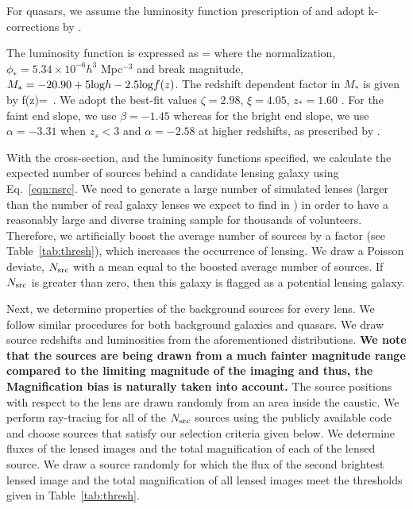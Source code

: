 \documentclass[useAMS,usenatbib,a4paper]{mn2e}
\begin{document}
For quasars, we assume the luminosity function prescription of \citet{Oguri2010}
and adopt k-corrections by \citep{Richards2006}.

The luminosity function is expressed as
\be
{}=
\ee
where the normalization, $\phi_{*}=5.34\times10^{-6} h^3$ Mpc$^{-3}$ and break
magnitude, $M_*=-20.90 + 5 {\rm log} h - 2.5 {\rm log} f(z)$. The redshift
dependent factor in $M_*$ is given by
\be
f(z)= \,.
\ee
We adopt the best-fit values $\zeta=2.98$, $\xi=4.05$, $z_{*}=1.60$
\citep{Oguri2010}. For the faint end slope, we use $\beta=-1.45$ whereas for
the bright end slope, we use $\alpha=-3.31$ when $z_s<3$ and $\alpha=-2.58$ at
higher redshifts, as prescribed by \citet{Oguri2010}.

With the cross-section, and the luminosity functions specified, we
calculate the expected number of sources behind a candidate lensing
galaxy using Eq.~\ref{eqn:nsrc}. We need to generate a large number of
simulated lenses (larger than the number of real galaxy lenses we expect
to find in \cfhtls) in order to have a reasonably large and diverse
training sample for thousands of \sw volunteers. Therefore, we
artificially boost the average number of sources by a factor (see
Table~\ref{tab:thresh}), which increases the occurrence of lensing. We
draw a Poisson deviate, $N_{\rm src}$ with a mean equal to the boosted
average number of sources. If $N_{\rm src}$ is greater than zero, then
this galaxy is flagged as a potential lensing galaxy.

Next, we determine properties of the background sources for every lens.
We follow similar procedures for both background galaxies and quasars.
We draw source redshifts and luminosities from the aforementioned
distributions. {\bf We note that the sources are being drawn from a much
fainter magnitude range compared to the limiting magnitude of the
\cfhtls imaging and thus, the Magnification bias is naturally taken into
account.} The source positions with respect to the lens are drawn
randomly from an area inside the caustic.  We perform ray-tracing for
all of the $N_{\rm src}$ sources using the publicly available code
\gravlens \citep{Keeton2000} and choose sources that satisfy our
selection criteria given below. We determine fluxes of the lensed images and the
total magnification of each of the lensed source. We draw a
source randomly for which the flux of the second brightest lensed image and the
total magnification of all lensed images meet the thresholds given
in Table~\ref{tab:thresh}.
\end{document}
